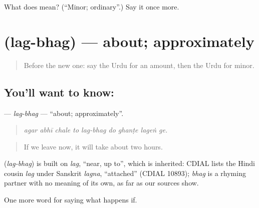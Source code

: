 \begin{tcolorbox}[breakable,colback=teal!4,colframe=teal!35!black,title={Before you move on}]
What does  mean? (\textquotedblleft{}Minor; ordinary\textquotedblright{}.) Say it once more.
\end{tcolorbox}
\section[\texorpdfstring{\ur{لگ} \ur{بھگ} (lag-bhag)}{لگ بھگ (lag-bhag)}]{  (lag-bhag) — about; approximately}

\label{lesson:UR-C376-lag-bhag}



\begin{quote}
Before the new one: say the Urdu for an amount, then the Urdu for minor.
\end{quote}

\subsection*{You'll want to know:  }
\textbf{ } — \emph{lag-bhag} — \textquotedblleft{}about; approximately\textquotedblright{}.

\begin{quote}
         
\end{quote}

\begin{quote}
\emph{agar abhī chale to lag-bhag do ghanṭe lageṅ ge.}
\end{quote}

\begin{quote}
If we leave now, it will take about two hours.
\end{quote}

\begin{cousinweb}
\textbf{ } (\emph{lag-bhag}) is built on \emph{lag}, \textquotedblleft{}near, up to\textquotedblright{}, which is inherited: CDIAL lists the Hindi cousin \emph{lag} under Sanskrit \emph{lagna}, \textquotedblleft{}attached\textquotedblright{} (CDIAL 10893); \emph{bhag} is a rhyming partner with no meaning of its own, as far as our sources show.
\end{cousinweb}

\begin{grammarlens}[title={What you've built}]
One more word for saying what happens if.
\end{grammarlens}

